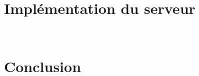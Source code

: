 \documentclass[11pt]{article}
\begin{document}
\section*{ Implémentation du serveur }
\setlength{\parindent}{20pt}
\\
\section*{ Conclusion }
\setlength{\parindent}{20pt}
\\
\end{document}
